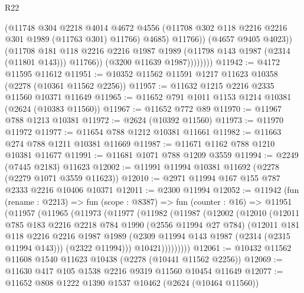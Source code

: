 \begin{lexlean}{R22}
\begin{coremodule}
                          (@11748
                            @304
                            @2218
                            @4014
                            @4672
                            @4556
                            (@11708 @302 @118 @2216 @2216 @301 @1989 (@11763 @301) @11766)
                            @4685)
                          @11766))
                      (@4657 @9405 @4023))
                    (@11708
                      @181
                      @118
                      @2216
                      @2216
                      @1987
                      @1989
                      (@11798 @143 @1987 (@2314 (@11801 @143)))
                      @11766))
                  (@3200 @11639 @1987))))))))
@11942 := @4172 @11595 @11612
@11951 := @10352 @11562 @11591 @1217 @11623 @10358 (@2278 (@10361 @11562 @2256))
@11957 := @11632 @1215 @2216 @2335 @11560 @10371 @11649
@11965 := @11652 @791 @1011 @1153 @1214 @10381 (@2624 (@10383 @11560))
@11967 := @11652 @772 @89
@11970 := @11967 @788 @1213 @10381
@11972 := @2624 (@10392 @11560)
@11973 := @11970 @11972
@11977 := @11654 @788 @1212 @10381 @11661
@11982 := @11663 @274 @788 @1211 @10381 @11669
@11987 := @11671 @1162 @788 @1210 @10381 @11677
@11991 := @11681 @1071 @788 @1209 @3559
@11994 := @2249 (@7445 @2183) @11623
@12002 := @11991 @11994 @10381 @11692 (@2278 (@2279 @1071 @3559 @11623))
@12010 := @2971 @11994 @167 @155 @787 @2333 @2216 @10406 @10371
@12011 := @2300 @11994
@12052 := @11942
    (fun (rename : @2213) =>
    fun (scope : @8387) =>
    fun (counter : @16) =>
    @11951
      (@11957
        (@11965
          (@11973
            (@11977
              (@11982
                (@11987
                  (@12002
                    (@12010
                      (@12011
                        @785
                        @183
                        @2216
                        @2218
                        @784
                        @1990
                        (@2556 @11994 @27 @784)
                        (@12011
                          @181
                          @118
                          @2216
                          @2216
                          @1987
                          @1989
                          (@2309 @11994 @143 @1987 (@2314 (@2315 @11994 @143)))
                          (@2322 @11994)))
                      @10421)))))))))
@12061 := @10432 @11562 @11608 @1540 @11623 @10438 (@2278 (@10441 @11562 @2256))
@12069 := @11630 @417 @105 @1538 @2216 @9319 @11560 @10454 @11649
@12077 := @11652 @808 @1222 @1390 @1537 @10462 (@2624 (@10464 @11560))

\end{coremodule}
\end{lexlean}
